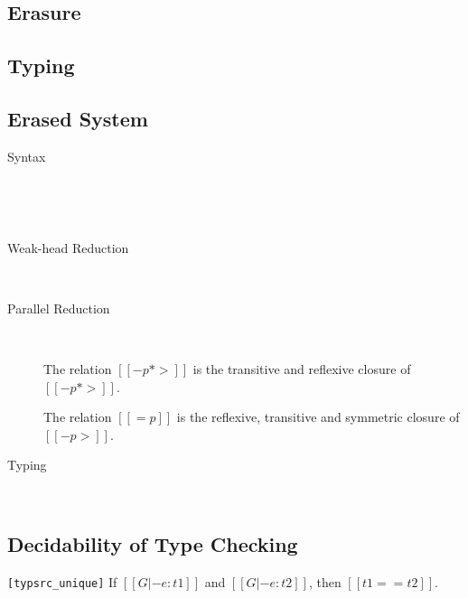 \subsection{Erasure}
\erasuredef

\subsection{Typing}
\ottdefnctx{}\ottinterrule
\ottdefnexprfull{}

\subsection{Erased System}
\begin{description}
\item[Syntax]
\hfill \\[5pt]
\begin{center}
\gram{\otter\ottinterrule
        \ottGr\ottinterrule
\ottvu}
\end{center}
\hfill \\[5pt]

\item[Weak-head Reduction]
\hfill \\[5pt]
\ottdefnstepr{}

\item[Parallel Reduction]
\hfill \\[5pt]
\ottdefnstepp{}
\begin{definition}
    The relation $[[-p*>]]$ is the transitive and reflexive closure of
    $[[-p*>]]$.
\end{definition}

\begin{definition}
  The relation $[[=p]]$ is the reflexive, transitive and symmetric
  closure of $[[-p>]]$.
\end{definition}

\item[Typing]
\hfill \\[5pt]
\ottdefnctxr{}\ottinterrule
\ottdefnexprr{}
\end{description}

\subsection{Decidability of Type Checking}
\begin{lemma}
\verb|[typsrc_unique]|
If $[[G |- e : t1]]$ and $[[G |- e : t2]]$, then $[[t1 == t2]]$.
\end{lemma}

